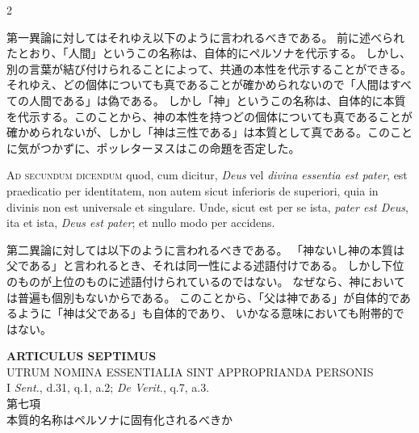\documentclass[paper=a4paper,fontsize=10pt,jafontsize=9pt,titlepage]{jlreq}
\begin{document}
\begin{paracol}{2}
\switchcolumn

第一異論に対してはそれゆえ以下のように言われるべきである。
前に述べられたとおり、「人間」というこの名称は、自体的にペルソナを代示する。
しかし、別の言葉が結び付けられることによって、共通の本性を代示することができる。
それゆえ、どの個体についても真であることが確かめられないので「人間はすべての人間である」は偽である。
しかし「神」というこの名称は、自体的に本質を代示する。このことから、神の本性を持つどの個体についても真であることが
確かめられないが、しかし「神は三性である」は本質として真である。このことに気がつかずに、ポッレターヌスはこの命題を否定した。

\switchcolumn*

\textsc{Ad secundum dicendum} quod, cum dicitur, \textit{Deus} vel \textit{divina essentia est pater}, est
praedicatio per identitatem, non autem sicut inferioris de superiori, quia in
divinis non est universale et singulare. Unde, sicut est per se ista, \textit{pater est
Deus}, ita et ista, \textit{Deus est pater}; et nullo modo per accidens.

\switchcolumn

第二異論に対しては以下のように言われるべきである。
「神ないし神の本質は父である」と言われるとき、それは同一性による述語付けである。
しかし下位のものが上位のものに述語付けられているのではない。
なぜなら、神においては普遍も個別もないからである。
このことから、「父は神である」が自体的であるように「神は父である」も自体的であり、
いかなる意味においても附帯的ではない。

\switchcolumn*

\end{paracol}
\newpage
{}
\begin{center}
 {\Large {\bfseries ARTICULUS SEPTIMUS}}\\
 {\large UTRUM NOMINA ESSENTIALIA SINT APPROPRIANDA PERSONIS}\\
 {\footnotesize I \textit{Sent.}, d.31, q.1, a.2; \textit{De Verit.}, q.7, a.3.}\\
 {\Large 第七項\\本質的名称はペルソナに固有化されるべきか}
\end{center}
\end{document}
